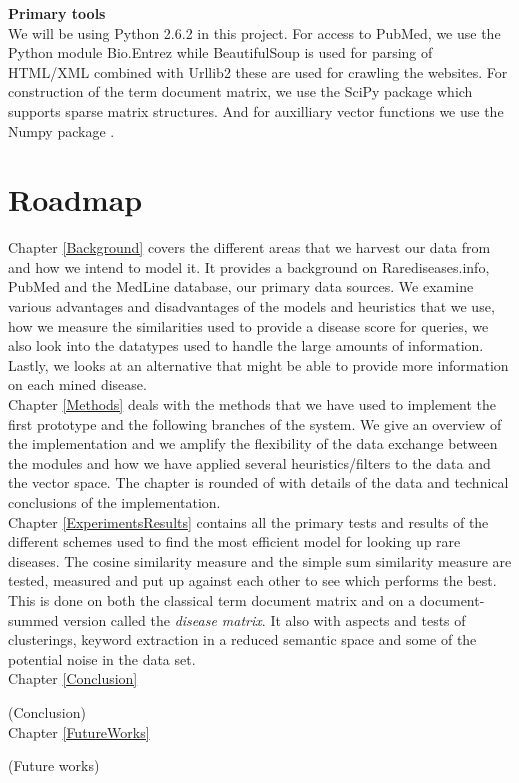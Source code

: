\textbf{Primary tools} \\ 
We will be using Python 2.6.2 \cite{PythonLanguage} in this project. For access to PubMed, we use
the Python module Bio.Entrez \cite{EntrezProgUtil} while BeautifulSoup
\cite{BS} is used for parsing of HTML/XML combined with Urllib2
\cite{UL2} these are used for crawling the websites. For construction
of the term document matrix, we use the SciPy package \cite{SciPy}
which supports sparse matrix structures. And for auxilliary vector
functions we use the Numpy package \cite{NumPy}.

\section{Roadmap}

Chapter \ref{Background} covers the different  areas
that we harvest our data from and how we intend to  model it. It provides a background on Rarediseases.info,
PubMed and the MedLine database, our primary data sources. We examine
various advantages and disadvantages of the models and heuristics that
we use, how we measure the similarities used to provide a disease
score for queries, we also look into the datatypes used to handle the
large amounts of information. Lastly, we looks at an alternative that
might be able to provide more information on each mined disease.\\

Chapter \ref{Methods} deals with the methods that we have used to
implement the first prototype and the following branches of the
system. We give an overview of the implementation and we amplify the
flexibility of the data exchange between the modules and how we have
applied several heuristics/filters to the data and the vector
space. The chapter is  rounded of with details of the data and
technical conclusions of the implementation.\\

Chapter \ref{ExperimentsResults} contains all the primary tests and
results of the different schemes used to find the most efficient model
for looking up rare diseases. The cosine similarity measure and the
simple sum similarity measure are tested, measured and put up against
each other to see which performs the best. This is done on
both the classical term document matrix and on a document-summed
version called the \textit{disease matrix}. It also with aspects and
tests of clusterings, keyword extraction in a reduced semantic space
and some of the potential noise in the data set.\\

Chapter \ref{Conclusion}

(Conclusion)\\

Chapter \ref{FutureWorks}

(Future works) \\
